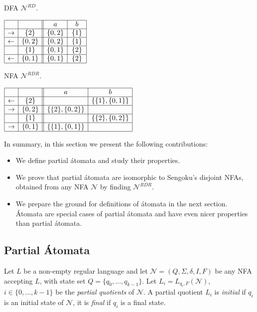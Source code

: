 \documentclass[preprint,12pt]{elsarticle}
\newcommand{\Sig}{\Sigma}
\newcommand{\bi}{\begin{itemize}}
\newcommand{\ei}{\end{itemize}}
\newcommand{\cN}{{\mathcal N}}
\begin{document}
\begin{table}[hbt]
\begin{minipage}[b]{0.4\linewidth}
\caption{DFA $\cN^{RD}$.}
\label{tab:Nrd}
{\footnotesize
\begin{center}
$
\begin{array}{|c| c||c| c| c|c|}    
\hline
& 
&\ \ a \ \ &\ \ b \ \   \\
\hline  
\rightarrow & \{2\}
&   \{0,2\}  &  \{1\}   \\
\hline  
\leftarrow & \{0,2\}
&    \{0,2\}   & \{ 1 \}\\
\hline  
		& \{1\}
&   \{0,1\}   &  \{2\} \\
\hline  
\leftarrow& \{0,1\}
&   \{0,1\}   &  \{2\} \\
\hline  
\end{array}
$
\end{center}}
\end{minipage}
\hspace{.5cm}
\begin{minipage}[b]{0.4\linewidth}
\caption{NFA $\cN^{RDR}$.}
\label{tab:Nrdr}
{\footnotesize
\begin{center}
$
\begin{array}{|c| c||c| c| c|c|}    
\hline
& 
&\ \ a \ \ &\ \ b \ \   \\
\hline  
\leftarrow & \{2\}
&     & \{ \{1\} , \{0,1\} \} \\
\hline  
\rightarrow & \{0,2\}
&   \{ \{2\},  \{0,2\} \}  & \\
\hline  
		& \{1\}
&     & \{ \{2\},  \{0,2\} \} \\
\hline  
\rightarrow& \{0,1\}
&   \{ \{1\} , \{0,1\} \}   &   \\
\hline  
\end{array}
$
\end{center}}
\end{minipage}
\end{table}
In summary, in this section we present the following contributions:
\bi
\item
We define partial \'atomata and study their properties.
\item
We prove that partial \'atomata are isomorphic to Sengoku's disjoint NFAs, obtained from any NFA $\cN$ by finding $\cN^{RDR}$.
\item
We prepare the ground for definitions of \'atomata in the next section.
\'Atomata are special cases of partial \'atomata and have even nicer properties than partial \'atomata.
\ei

\subsection{Partial \'Atomata}
Let $L$ be a non-empty regular language and 
let $\cN=(Q, \Sig, \delta, I,F)$ be any NFA accepting $L$, with
state set $Q=\{q_0,\ldots,q_{k-1}\}$.
Let   $L_i=L_{q_i,F}(\cN)$, $i\in\{0,\ldots,k-1\}$ be 
the  \emph{partial quotients} of $\cN$.
A partial quotient $L_i$ is \emph{initial} if $q_i$ is an initial state of $\cN$,
it is \emph{final} if $q_i$ is a final state.
\end{document}
